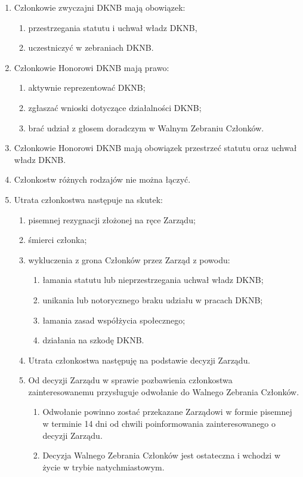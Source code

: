 \documentclass{article}
\begin{document}
\begin{enumerate}
    \item Członkowie zwyczajni DKNB mają obowiązek:
      \begin{enumerate}
        \item przestrzegania statutu i uchwał władz DKNB,
        \item uczestniczyć w zebraniach DKNB.
      \end{enumerate}
    \item Członkowie Honorowi DKNB mają prawo:
      \begin{enumerate}
        \item aktywnie reprezentować DKNB;
        \item zgłaszać wnioski dotyczące działalności DKNB;
        \item brać udział z głosem doradczym w Walnym Zebraniu Członków.
      \end{enumerate}
    \item Członkowie Honorowi DKNB mają obowiązek przestrzeć statutu oraz uchwał władz DKNB.
    \item Członkostw różnych rodzajów nie można łączyć.
    \item Utrata członkostwa następuje na skutek:
      \begin{enumerate}
        \item pisemnej rezygnacji złożonej na ręce Zarządu;
        \item śmierci członka;
        \item wykluczenia z grona Członków przez Zarząd z powodu:
          \begin{enumerate}
            \item łamania statutu lub nieprzestrzegania uchwał władz DKNB;
            \item unikania lub notorycznego braku udziału w pracach DKNB;
            \item łamania zasad współżycia społecznego;
            \item działania na szkodę DKNB.
          \end{enumerate}
        \item Utrata członkostwa następuję na podstawie decyzji Zarządu.
        \item Od decyzji Zarządu w sprawie pozbawienia członkostwa zainteresowanemu przysługuje odwołanie do Walnego Zebrania Członków.
          \begin{enumerate}
            \item Odwołanie powinno zostać przekazane Zarządowi w formie pisemnej w terminie 14 dni od chwili poinformowania zainteresowanego o decyzji Zarządu.
            \item Decyzja Walnego Zebrania Członków jest ostateczna i wchodzi w życie w trybie natychmiastowym.
          \end{enumerate}
      \end{enumerate}
  \end{enumerate}
\end{document}
